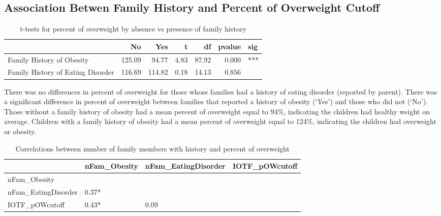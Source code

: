 \documentclass[
]{article}
\begin{document}
\FloatBarrier

\hypertarget{association-betwen-family-history-and-percent-of-overweight-cutoff}{%
\subsection{Association Betwen Family History and Percent of Overweight
Cutoff}\label{association-betwen-family-history-and-percent-of-overweight-cutoff}}

\begin{table}[!h]

\caption{\label{tab:IOTF_pOWcutoff_FamHistory_ttests}t-tests for percent of overweight by absence vs presence of family history}
\centering
\begin{tabular}[t]{lrrrrrl}
\toprule
  & No & Yes & t & df & pvalue & sig\\
\midrule
Family History of Obesity & 125.09 & 94.77 & 4.83 & 87.92 & 0.000 & ***\\
Family History of Eating Disorder & 116.69 & 114.82 & 0.18 & 14.13 & 0.856 & \\
\bottomrule
\end{tabular}
\end{table}

\FloatBarrier

There was no differences in percent of overweight for those whose
families had a history of eating disorder (reported by parent). There
was a significant difference in percent of overweight between families
that reported a history of obesity (`Yes') and those who did not (`No').
Those without a family history of obesity had a mean percent of
overweight equal to 94\%, indicating the children had healthy weight on
average. Children with a family history of obesity had a mean percent of
overweight equal to 124\%, indicating the children had overweight or
obesity.

\FloatBarrier

\begin{table}[!h]

\caption{\label{tab:IOTF_pOWcutoff_nFam_cor}Correlations between number of family members with history and percent of overweight}
\centering
\begin{tabular}[t]{llll}
\toprule
  & nFam\_Obesity & nFam\_EatingDisorder & IOTF\_pOWcutoff\\
\midrule
nFam\_Obesity &  &  & \\
nFam\_EatingDisorder & 0.37* &  & \\
IOTF\_pOWcutoff & 0.43* & 0.09 & \\
\bottomrule
\end{tabular}
\end{table}
\end{document}
